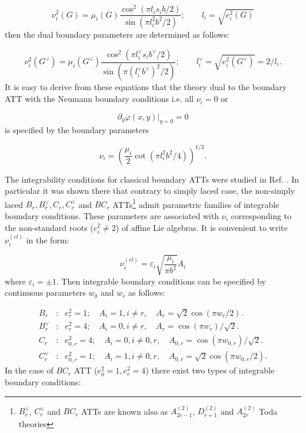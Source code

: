 \documentclass[a4paper,12pt,titlepage,final]{article}
\begin{document}
\begin{equation}
\nu _{i}^{2}(G)=\mu _{i}(G)\frac{\cos ^{2}(\pi l_{i}s_{i}b/2)}{\sin (\pi
l_{i}^{2}b^{2}/2)};\qquad l_{i}=\sqrt{e_{i}^{2}(G)}  \label{nB}
\end{equation}
then the dual boundary parameters are determined as follows:

\begin{equation}
\nu _{i}^{2}(G^{\vee })=\mu _{i}(G^{\vee })\frac{\cos ^{2}(\pi
l_{i}^{\vee } s_{i}b^{\vee }/2)}{\sin (\pi (l_{i}^{\vee }b^{\vee
})^{2}/2)};\qquad l_{i}^{\vee }=\sqrt{e_{i}^{2}(G^{\vee })}=2/l_{i}.
\label{nBD}
\end{equation}
It is easy to derive from these equations that the theory dual to the 
boundary
ATT with the Neumann boundary conditions i.e. all $\nu _{i}=0$ or

\begin{equation}
\partial _{y}\varphi (x,y)|_{y=0}=0  \label{N}
\end{equation}
is specified by the boundary parameters

\begin{equation}
\nu _{i}=\left( \frac{\mu _{i}}{2}\cot (\pi l_{i}^{2}b^{2}/4)\right) ^{1/2}.
\label{ND}
\end{equation}

The integrability conditions for classical boundary ATTs were studied in
Ref. \cite{BCD}. In particular it was shown there that contrary to simply
laced case, the non-simply laced $B_{r},B_{r}^{\vee },C_{r},C_{r}^{\vee }$
and $BC_{r}$ ATTs\footnote{$B_{r}^{\vee }$, $C_{r}^{\vee }$ and $BC_{r}$
ATTs
are known also as $A^{(2)}_{2r-1}$, $D^{(2)}_{r+1}$
and $A^{(2)}_{2r}$ Toda theories}
admit  parametric families of integrable boundary
conditions. These parameters are associated with $\nu _{i}$ corresponding to
the non-standard roots ($e_{i}^{2}\neq 2$) of affine Lie algebras. It is
convenient to write $\nu _{i}^{(cl)}$ in the form:

\begin{equation}
\nu _{i}^{(cl)}=\varepsilon _{i}\sqrt{\frac{\mu _{i}}{\pi b^{2}}}A_{i}
\label{sig}
\end{equation}
where $\varepsilon _{i}=\pm 1$. Then integrable boundary conditions can be
specified by continuous parameters $w_{0}$ and $w_{r}$ as follows:


\begin{eqnarray}
B_{r} &:&e_{r}^{2}=1;\quad A_{i}=1,i\neq r,\quad A_{r}=
\sqrt{2}\cos (\pi w_{r}/2).  \label{Bcl} \\
B_{r}^{\vee } &:&e_{r}^{2}=4;\quad A_{i}=0,i\neq r,\quad A_{r}=
\cos (\pi w_{r})/\sqrt{2}.  \label{Bdcl} \\
C_{r} &:&e_{0,r}^{2}=4;\quad A_{i}=0,i\neq 0,r,\quad A_{0,r}=
\cos (\pi w_{0,r})/\sqrt{2}.  \label{Ccl} \\
C_{r}^{\vee } &:&e_{0,r}^{2}=1;\quad A_{i}=1,i\neq 0,r,\quad A_{0,r}=
\sqrt{2}\cos (\pi w_{0,r}/2).  \label{Cd}
\end{eqnarray}
In the case of $BC_{r}$ ATT ($e_{0}^{2}=1,e_{r}^{2}=4$) there exist two
types of integrable boundary conditions:
\end{document}
